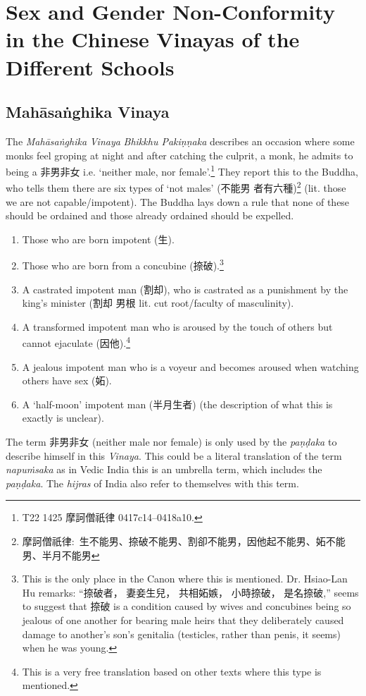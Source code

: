 \section{Sex and Gender Non-Conformity in the Chinese Vinayas of the Different Schools}
\label{appendix1}

\subsection{Mahāsaṅghika Vinaya}
The {\em Mahāsaṅghika} {\em Vinaya} {\em Bhikkhu Pakiṇṇaka} describes an occasion where some monks feel groping at night and after catching the culprit, a monk, he admits to being a 非男非女 i.e. `neither male, nor female'.\footnote{T22 1425 摩訶僧祇律 0417c14–0418a10.} They report this to the Buddha, who tells them there are six types of `not males' (不能男 者有六種)\footnote{摩訶僧祇律: 生不能男、捺破不能男、割卻不能男，因他起不能男、妬不能男、半月不能男} (lit. those we are not capable/impotent). The Buddha lays down a rule that none of these should be ordained and those already ordained should be expelled.

\begin{enumerate}
\item Those who are born impotent (生). 
\item Those who are born from a concubine (捺破).\footnote{This is the only place in the Canon where this is mentioned. Dr. Hsiao-Lan Hu remarks: ``捺破者， 妻妾生兒， 共相妬嫉， 小時捺破， 是名捺破,'' seems to suggest that 捺破 is a condition caused by wives and concubines being so jealous of one another for bearing male heirs that they deliberately caused damage to another's son's genitalia (testicles, rather than penis, it seems) when he was young.} 
\item A castrated impotent man (割却), who is castrated as a punishment by the king's minister (割却 男根 lit. cut root/faculty of masculinity).
\item A transformed impotent man who is aroused by the touch of others but cannot ejaculate (因他).\footnote{This is a very free translation based on other texts where this type is mentioned.}
\item A jealous impotent man who is a voyeur and becomes aroused when watching others have sex (妬).
\item A `half-moon' impotent man (半月生者) (the description of what this is exactly is unclear).
\end{enumerate}

The term 非男非女 (neither male nor female) is only used by the {\em paṇḍaka} to describe himself in this {\em Vinaya}. This could be a literal translation of the term {\em napuṁsaka} as in Vedic India this is an umbrella term, which includes the {\em paṇḍaka}. The {\em hijras} of India also refer to themselves with this term.

